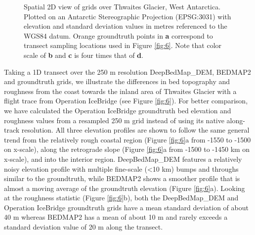 \documentclass[tc, manuscript]{copernicus}
\begin{document}
\begin{figure*}[htbp]
  \centering
  \qquad
  \caption{
    Spatial 2D view of grids over Thwaites Glacier, West Antarctica.
    Plotted on an Antarctic Stereographic Projection (EPSG:3031) with elevation and standard deviation values in metres referenced to the WGS84 datum.
    Orange groundtruth points in \textbf{a} correspond to transect sampling locations used in Figure \ref{fig:6}.
    Note that color scale of \textbf{b} and \textbf{c} is four times that of \textbf{d}.
  }
  \label{fig:5}
\end{figure*}

Taking a 1D transect over the 250 m resolution DeepBedMap\_DEM, BEDMAP2 and groundtruth grids, we illustrate the differences in bed topography and roughness from the coast towards the inland area of Thwaites Glacier with a flight trace from Operation IceBridge (see Figure \ref{fig:6}).
For better comparison, we have calculated the Operation IceBridge groundtruth bed elevation and roughness values from a resampled 250 m grid instead of using its native along-track resolution.
All three elevation profiles are shown to follow the same general trend from the relatively rough coastal region (Figure \ref{fig:6}a from -1550 to -1500 on x-scale), along the retrograde slope (Figure \ref{fig:6}a from -1500 to -1450 km on x-scale), and into the interior region.
DeepBedMap\_DEM features a relatively noisy elevation profile with multiple fine-scale (<10 km) bumps and throughs similar to the groundtruth, while BEDMAP2 shows a smoother profile that is almost a moving average of the groundtruth elevation (Figure \ref{fig:6}a).
Looking at the roughness statistic (Figure \ref{fig:6}b), both the DeepBedMap\_DEM and Operation IceBridge groundtruth grids have a mean standard deviation of about 40 m whereas BEDMAP2 has a mean of about 10 m and rarely exceeds a standard deviation value of 20 m along the transect.
\end{document}
